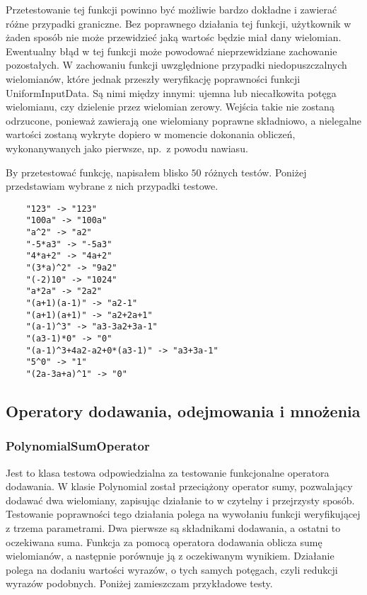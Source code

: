 \documentclass[oneside,a4paper]{book}
\begin{document}
	Przetestowanie tej funkcji powinno być możliwie bardzo dokładne i zawierać różne przypadki graniczne. Bez poprawnego działania tej funkcji, użytkownik w żaden sposób nie może przewidzieć jaką wartośc będzie miał dany wielomian. Ewentualny błąd w tej funkcji może powodować nieprzewidziane zachowanie pozostałych. W zachowaniu funkcji uwzględnione przypadki niedopuszczalnych wielomianów, które jednak przeszły weryfikację poprawności funkcji UniformInputData. Są nimi między innymi: ujemna lub niecałkowita potęga wielomianu, czy dzielenie przez wielomian zerowy. Wejścia takie nie zostaną odrzucone, ponieważ zawierają one wielomiany poprawne składniowo, a nielegalne wartości zostaną wykryte dopiero w momencie dokonania obliczeń, wykonanywanych jako pierwsze, np.\ z powodu nawiasu.
	
	By przetestować funkcję, napisałem blisko $50$ różnych testów. Poniżej przedstawiam wybrane z nich przypadki testowe.
	
	\begin{lstlisting}
	"123" -> "123"
	"100a" -> "100a"
	"a^2" -> "a2"
	"-5*a3" -> "-5a3"
	"4*a+2" -> "4a+2"
	"(3*a)^2" -> "9a2"
	"(-2)10" -> "1024"
	"a*2a" -> "2a2"
	"(a+1)(a-1)" -> "a2-1"
	"(a+1)(a+1)" -> "a2+2a+1"
	"(a-1)^3" -> "a3-3a2+3a-1"
	"(a3-1)*0" -> "0"
	"(a-1)^3+4a2-a2+0*(a3-1)" -> "a3+3a-1"
	"5^0" -> "1"
	"(2a-3a+a)^1" -> "0"
	\end{lstlisting}
	
	\subsection{Operatory dodawania, odejmowania i mnożenia}
	
	\subsubsection{PolynomialSumOperator}
	
	Jest to klasa testowa odpowiedzialna za testowanie funkcjonalne operatora dodawania. W klasie Polynomial został przeciążony operator sumy, pozwalający dodawać dwa wielomiany, zapisując działanie to w czytelny i przejrzysty sposób. Testowanie poprawności tego działania polega na wywołaniu funkcji weryfikującej z trzema parametrami. Dwa pierwsze są składnikami dodawania, a ostatni to oczekiwana suma. Funkcja za pomocą operatora dodawania oblicza sumę wielomianów, a następnie porównuje ją z oczekiwanym wynikiem. Działanie polega na dodaniu wartości wyrazów, o tych samych potęgach, czyli redukcji wyrazów podobnych. Poniżej zamieszczam przykładowe testy.
	
\end{document}
